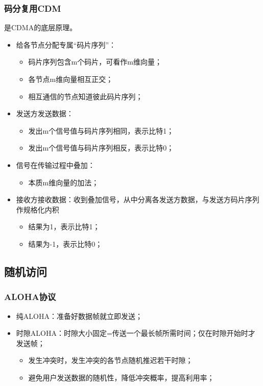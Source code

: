 \subsubsection{码分复用CDM}
是CDMA的底层原理。

\begin{itemize}
    \item 给各节点分配专属“码片序列”：\begin{itemize}
        \item 码片序列包含m个码片，可看作m维向量；
        \item 各节点m维向量相互正交；
        \item 相互通信的节点知道彼此码片序列；
    \end{itemize}
    \item 发送方发送数据：\begin{itemize}
        \item 发出m个信号值与码片序列相同，表示比特1；
        \item 发出m个信号值与码片序列相反，表示比特0；
    \end{itemize}
    \item 信号在传输过程中叠加：\begin{itemize}
        \item 本质m维向量的加法；
    \end{itemize}
    \item 接收方接收数据：收到叠加信号，从中分离各发送方数据，与发送方码片序列作规格化内积\begin{itemize}
        \item 结果为1，表示比特1；
        \item 结果为-1，表示比特0；
    \end{itemize}
\end{itemize}


\subsection{随机访问}

\subsubsection{ALOHA协议}
\begin{itemize}
    \item 纯ALOHA：准备好数据帧就立即发送；
    \item 时隙ALOHA：时隙大小固定=传送一个最长帧所需时间；仅在时隙开始时才发送帧；\begin{itemize}
        \item 发生冲突时，发生冲突的各节点随机推迟若干时隙；
        \item 避免用户发送数据的随机性，降低冲突概率，提高利用率；
    \end{itemize}
\end{itemize}


